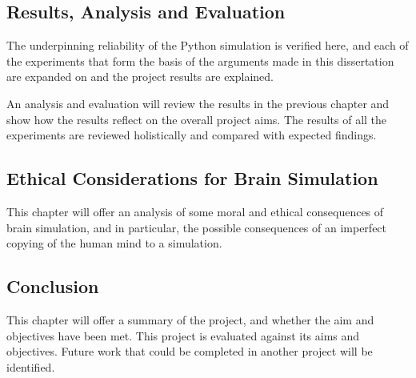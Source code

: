 \subsection*{Results, Analysis and Evaluation}
The underpinning reliability of the Python simulation is verified here, and each
of the experiments that form the basis of the arguments made in this
dissertation are expanded on and the project results are explained.

An analysis and evaluation will review the results in the previous chapter and
show how the results reflect on the overall project aims. The results of all the
experiments are reviewed holistically and compared with expected findings.

\subsection*{Ethical Considerations for Brain Simulation}
This chapter will offer an analysis of some moral and ethical consequences of
brain simulation, and in particular, the possible consequences of an imperfect
copying of the human mind to a simulation.

\subsection*{Conclusion}
This chapter will offer a summary of the project, and whether the aim and
objectives have been met. This project is evaluated against its aims and
objectives. Future work that could be completed in another project will be
identified.